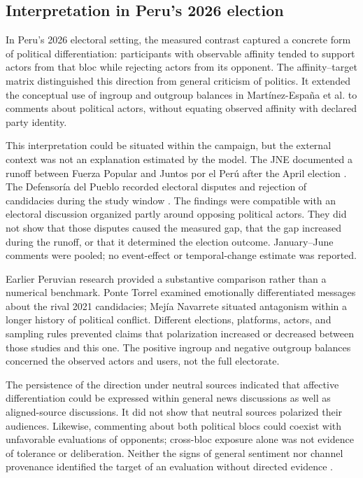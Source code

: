 \documentclass[conference, letterpaper]{IEEEtran}
\begin{document}
\subsection{Interpretation in Peru's 2026 election}
In Peru's 2026 electoral setting, the measured contrast captured a concrete form of political differentiation: participants with observable affinity tended to support actors from that bloc while rejecting actors from its opponent. The affinity--target matrix distinguished this direction from general criticism of politics. It extended the conceptual use of ingroup and outgroup balances in Martínez-España et al. \cite{polariz} to comments about political actors, without equating observed affinity with declared party identity.

This interpretation could be situated within the campaign, but the external context was not an explanation estimated by the model. The JNE documented a runoff between Fuerza Popular and Juntos por el Perú after the April election \cite{JNE11352026}. The Defensoría del Pueblo recorded electoral disputes and rejection of candidacies during the study window \cite{Defensoria2842026}. The findings were compatible with an electoral discussion organized partly around opposing political actors. They did not show that those disputes caused the measured gap, that the gap increased during the runoff, or that it determined the election outcome. January--June comments were pooled; no event-effect or temporal-change estimate was reported.

Earlier Peruvian research provided a substantive comparison rather than a numerical benchmark. Ponte Torrel \cite{Ponte2022} examined emotionally differentiated messages about the rival 2021 candidacies; Mejía Navarrete \cite{Mejia2024} situated antagonism within a longer history of political conflict. Different elections, platforms, actors, and sampling rules prevented claims that polarization increased or decreased between those studies and this one. The positive ingroup and negative outgroup balances concerned the observed actors and users, not the full electorate.

The persistence of the direction under neutral sources indicated that affective differentiation could be expressed within general news discussions as well as aligned-source discussions. It did not show that neutral sources polarized their audiences. Likewise, commenting about both political blocs could coexist with unfavorable evaluations of opponents; cross-bloc exposure alone was not evidence of tolerance or deliberation. Neither the signs of general sentiment nor channel provenance identified the target of an evaluation without directed evidence \cite{BestvaterMonroe2023,Miehling2025}.
\end{document}
